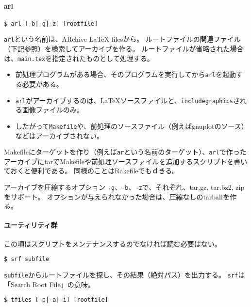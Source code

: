 \hypertarget{arl}{%
\paragraph{arl}\label{arl}}

\begin{verbatim}
$ arl [-b|-g|-z] [rootfile]
\end{verbatim}

\texttt{arl}という名前は、ARchive LaTeX filesから。
ルートファイルの関連ファイル（下記参照）を検索してアーカイブを作る。
ルートファイルが省略された場合は、\texttt{main.tex}を指定されたものとして処理する。

\begin{itemize}
\tightlist
\item
  前処理プログラムがある場合、そのプログラムを実行してから\texttt{arl}を起動する必要がある。
\item
  \texttt{arl}がアーカイブするのは、LaTeXソースファイルと、\texttt{includegraphics}される画像ファイルのみ。
\item
  したがって\texttt{Makefile}や、前処理のソースファイル（例えばgnuplotのソース）などはアーカイブされない。
\end{itemize}

Makefileにターゲットを作り（例えば\texttt{ar}という名前のターゲット）、\texttt{arl}で作ったアーカイブにtarでMakefileや前処理ソースファイルを追加するスクリプトを書いておくと便利である。
同様のことはRakefileでもｄきる。

アーカイブを圧縮するオプション
\texttt{-g}、\texttt{-b}、\texttt{-z}で、それぞれ、tar.gz, tar.bz2,
zipをサポート。
オプションが与えられなかった場合は、圧縮なしのtarballを作る。

\hypertarget{ux30e6ux30fcux30c6ux30a3ux30eaux30c6ux30a3ux7fa4}{%
\paragraph{ユーティリティ群}\label{ux30e6ux30fcux30c6ux30a3ux30eaux30c6ux30a3ux7fa4}}

この項はスクリプトをメンテナンスするのでなければ読む必要はない。

\begin{verbatim}
$ srf subfile
\end{verbatim}

\texttt{subfile}からルートファイルを探し、その結果（絶対パス）を出力する。
\texttt{srf}は「Search Root File」の意味。

\begin{verbatim}
$ tfiles [-p|-a|-i] [rootfile]
\end{verbatim}

